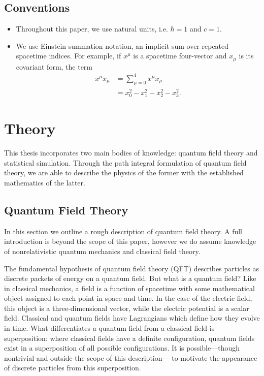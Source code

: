 \documentclass[12pt]{report}
\begin{document}
\section{Conventions}
\begin{itemize}
    \item Throughout this paper, we use natural units, i.e. $\hbar = 1$ and $c=1$.
    \item We use Einstein summation notation, an implicit sum over repeated spacetime indices. For example, if $x^\mu$ is a spacetime four-vector and $x_\mu$ is its covariant form, the term
        \begin{align*}
            x^\mu x_\mu &= \sum^4_{\mu=0} x^\mu x_\mu \\
            &= x_0^2-x_1^2-x_2^2-x_3^2.
        \end{align*}
\end{itemize}


\chapter{Theory}

This thesis incorporates two main bodies of knowledge: quantum field theory and statistical simulation. Through the path integral formulation of quantum field theory, we are able to describe the physics of the former with the established mathematics of the latter.

\section{Quantum Field Theory}


In this section we outline a rough description of quantum field theory. A full introduction is beyond the scope of this paper, however we do assume knowledge of nonrelativistic quantum mechanics and classical field theory.

The fundamental hypothesis of quantum field theory (QFT) describes particles as discrete packets of energy on a quantum field. But what is a quantum field? Like in classical mechanics, a field is a function of spacetime with some mathematical object assigned to each point in space and time. In the case of the electric field, this object is a three-dimensional vector, while the electric potential is a scalar field. Classical and quantum fields have Lagrangians which define how they evolve in time. What differentiates a quantum field from a classical field is superposition: where classical fields have a definite configuration, quantum fields exist in a superposition of all possible configurations. It is possible---though nontrivial and outside the scope of this description--- to motivate the appearance of discrete particles from this superposition.
\end{document}
